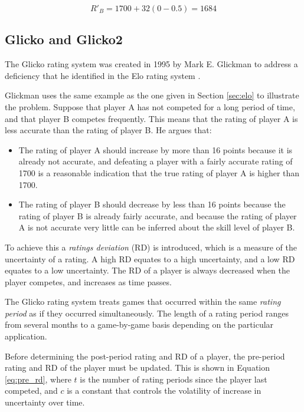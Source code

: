 \begin{equation} \label{eq:update_ex_b}
R'_B = 1700 + 32 \left( 0 - 0.5 \right) = 1684
\end{equation}

\subsection{Glicko and Glicko2}
\label{sec:glicko}
The Glicko rating system was created in 1995 by Mark E. Glickman to address a deficiency that he identified in the Elo rating system \cite{glicko}.

Glickman uses the same example as the one given in Section \ref{sec:elo} to illustrate the problem.
Suppose that player A has not competed for a long period of time, and that player B competes frequently.
This means that the rating of player A is less accurate than the rating of player B.
He argues that:

\begin{itemize}
	\item{The rating of player A should increase by more than 16 points because it is already not accurate, and defeating a player with a fairly accurate rating of 1700 is a reasonable indication that the true rating of player A is higher than 1700.}
	\item{The rating of player B should decrease by less than 16 points because the rating of player B is already fairly accurate, and because the rating of player A is not accurate very little can be inferred about the skill level of player B.}
\end{itemize}

To achieve this a \emph{ratings deviation} (RD) is introduced, which is a measure of the uncertainty of a rating.
A high RD equates to a high uncertainty, and a low RD equates to a low uncertainty.
The RD of a player is always decreased when the player competes, and increases as time passes.

The Glicko rating system treats games that occurred within the same \emph{rating period} as if they occurred simultaneously.
The length of a rating period ranges from several months to a game-by-game basis depending on the particular application.

Before determining the post-period rating and RD of a player, the pre-period rating and RD of the player must be updated.
This is shown in Equation \ref{eq:pre_rd}, where $t$ is the number of rating periods since the player last competed, and $c$ is a constant that controls the volatility of increase in uncertainty over time.

